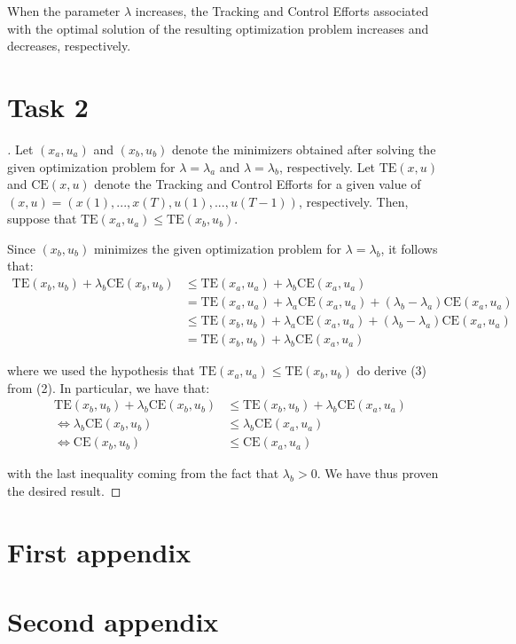\documentclass[12pt]{article}
\begin{document}
When the parameter $\lambda$ increases, the Tracking and Control Efforts associated with the optimal solution of the resulting optimization problem increases and decreases, respectively. \\

\section{Task 2}

\begin{proof}[\unskip\nopunct]
    Let $(x_a, u_a)$ and $(x_b, u_b)$ denote the minimizers obtained after solving the given optimization problem for $\lambda = \lambda_{a}$ and $\lambda = \lambda_{b}$, respectively. Let $\text{TE}(x, u)$ and $\text{CE}(x, u)$ denote the Tracking and Control Efforts for a given value of $(x, u) = (x(1), ..., x(T), u(1), ..., u(T - 1))$, respectively.
    Then, suppose that $\text{TE}(x_a, u_a) \le \text{TE}(x_b, u_b)$.

    Since $(x_b, u_b)$ minimizes the given optimization problem for $\lambda = \lambda_b$, it follows that:
    \vspace{-0.3em}
    \begin{align}
        \text{TE}(x_b, u_b) + \lambda_b \text{CE}(x_b, u_b) & \le 
        \text{TE}(x_a, u_a) + \lambda_b \text{CE}(x_a, u_a) \\
        & = 
        \text{TE}(x_a, u_a) + \lambda_a \text{CE}(x_a, u_a) + ( \lambda_b -  \lambda_a) \text{CE}(x_a, u_a) \\
        & \le 
        \text{TE}(x_b, u_b) + \lambda_a \text{CE}(x_a, u_a) + ( \lambda_b -  \lambda_a) \text{CE}(x_a, u_a) \\
        & = \text{TE}(x_b, u_b) + \lambda_b \text{CE}(x_a, u_a)
    \end{align}

    where we used the hypothesis that $\text{TE}(x_a, u_a) \le \text{TE}(x_b, u_b)$ do derive (3) from (2). In particular, we have that:
    \vspace{-0.3em}
    \begin{align}
        \text{TE}(x_b, u_b) + \lambda_b \text{CE}(x_b, u_b) & \le 
        \text{TE}(x_b, u_b) + \lambda_b \text{CE}(x_a, u_a) \\
        \Leftrightarrow \lambda_b \text{CE}(x_b, u_b) & \le 
        \lambda_b \text{CE}(x_a, u_a) \\
        \Leftrightarrow \text{CE}(x_b, u_b) &\le \text{CE}(x_a, u_a)
    \end{align}

    with the last inequality coming from the fact that $\lambda_b > 0$. We have thus proven the desired result.
\end{proof}







\appendix  
\clearpage
\addappheadtotoc 
\appendixpage 

\section{First appendix}

\lipsum[1]

\section{Second appendix}

\lipsum[1]
\end{document}

